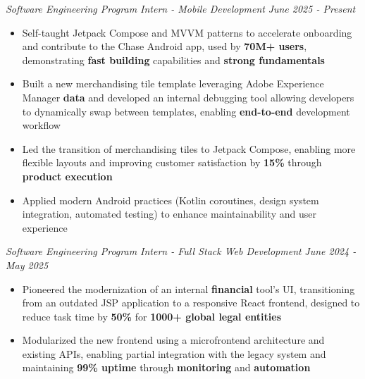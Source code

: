 \documentclass[letterpaper]{article}
\newenvironment{tightitemize}{%
  \begin{itemize}\small\setlength{\baselineskip}{0.95\baselineskip}\itemsep -1mm%
}{\end{itemize}}
\begin{document}
    \textit{Software Engineering Program Intern - Mobile Development} \hfill \textsl{June 2025 - Present}\\
    \vspace{-7pt}
    \begin{tightitemize} \itemsep -1mm

            \item Self-taught Jetpack Compose and MVVM patterns to accelerate onboarding and contribute to the Chase Android app, used by \textbf{70M+ users}, demonstrating \textbf{fast building} capabilities and \textbf{strong fundamentals}
            
            \item Built a new merchandising tile template leveraging Adobe Experience Manager \textbf{data} and developed an internal debugging tool allowing developers to dynamically swap between templates, enabling \textbf{end-to-end} development workflow
            
            \item Led the transition of merchandising tiles to Jetpack Compose, enabling more flexible layouts and improving customer satisfaction by \textbf{15\%} through \textbf{product execution}
            
            \item Applied modern Android practices (Kotlin coroutines, design system integration, automated testing) to enhance maintainability and user experience    \end{tightitemize}
    \textit{Software Engineering Program Intern - Full Stack Web Development} \hfill \textsl{June 2024 - May 2025}\\
    \vspace{-7pt}
    \begin{tightitemize} \itemsep -1mm

            \item Pioneered the modernization of an internal \textbf{financial} tool's UI, transitioning from an outdated JSP application to a responsive React frontend, designed to reduce task time by \textbf{50\%} for \textbf{1000+ global legal entities}

            \item Modularized the new frontend using a microfrontend architecture and existing APIs, enabling partial integration with the legacy system and maintaining \textbf{99\% uptime} through \textbf{monitoring} and \textbf{automation}
                    
    \end{tightitemize}
    \vspace{-2mm}
\end{document}
